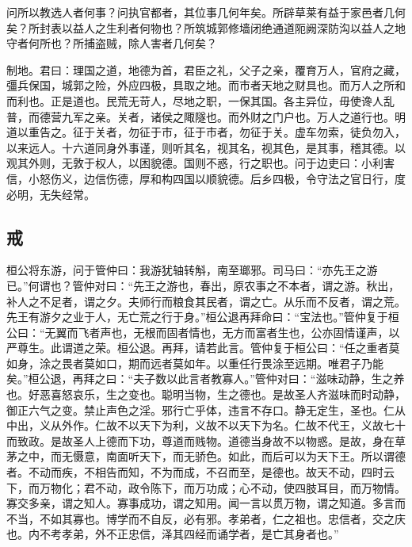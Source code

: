 \documentclass[]{article}
\begin{document}
问所以教选人者何事？问执官都者，其位事几何年矣。所辟草莱有益于家邑者几何矣？所封表以益人之生利者何物也？所筑城郭修墙闭绝通道阨阙深防沟以益人之地守者何所也？所捕盗贼，除人害者几何矣？

制地。君曰：理国之道，地德为首，君臣之礼，父子之亲，覆育万人，官府之藏，彊兵保国，城郭之险，外应四极，具取之地。而市者天地之财具也。而万人之所和而利也。正是道也。民荒无苛人，尽地之职，一保其国。各主异位，毋使谗人乱普，而德营九军之亲。关者，诸侯之陬隧也。而外财之门户也。万人之道行也。明道以重告之。征于关者，勿征于市，征于市者，勿征于关。虚车勿索，徒负勿入，以来远人。十六道同身外事谨，则听其名，视其名，视其色，是其事，稽其德。以观其外则，无敦于权人，以困貌德。国则不惑，行之职也。问于边吏曰：小利害信，小怒伤义，边信伤德，厚和构四国以顺貌德。后乡四极，令守法之官日行，度必明，无失经常。

\hypertarget{header-n380}{%
\subsection{戒}\label{header-n380}}

桓公将东游，问于管仲曰：我游犹轴转斛，南至瑯邪。司马曰：``亦先王之游已。''何谓也？管仲对曰：``先王之游也，春出，原农事之不本者，谓之游。秋出，补人之不足者，谓之夕。夫师行而粮食其民者，谓之亡。从乐而不反者，谓之荒。先王有游夕之业于人，无亡荒之行于身。''桓公退再拜命曰：``宝法也。''管仲复于桓公曰：``无翼而飞者声也，无根而固者情也，无方而富者生也，公亦固情谨声，以严尊生。此谓道之荣。桓公退。再拜，请若此言。管仲复于桓公曰：``任之重者莫如身，涂之畏者莫如口，期而远者莫如年。以重任行畏涂至远期。唯君子乃能矣。''桓公退，再拜之曰：``夫子数以此言者教寡人。''管仲对曰：``滋味动静，生之养也。好恶喜怒哀乐，生之变也。聪明当物，生之德也。是故圣人齐滋味而时动静，御正六气之变。禁止声色之淫。邪行亡乎体，违言不存口。静无定生，圣也。仁从中出，义从外作。仁故不以天下为利，义故不以天下为名。仁故不代王，义故七十而致政。是故圣人上德而下功，尊道而贱物。道德当身故不以物惑。是故，身在草茅之中，而无慑意，南面听天下，而无骄色。如此，而后可以为天下王。所以谓德者。不动而疾，不相告而知，不为而成，不召而至，是德也。故天不动，四时云下，而万物化；君不动，政令陈下，而万功成；心不动，使四肢耳目，而万物情。寡交多亲，谓之知人。寡事成功，谓之知用。闻一言以贯万物，谓之知道。多言而不当，不如其寡也。博学而不自反，必有邪。孝弟者，仁之祖也。忠信者，交之庆也。内不考孝弟，外不正忠信，泽其四经而诵学者，是亡其身者也。''
\end{document}
